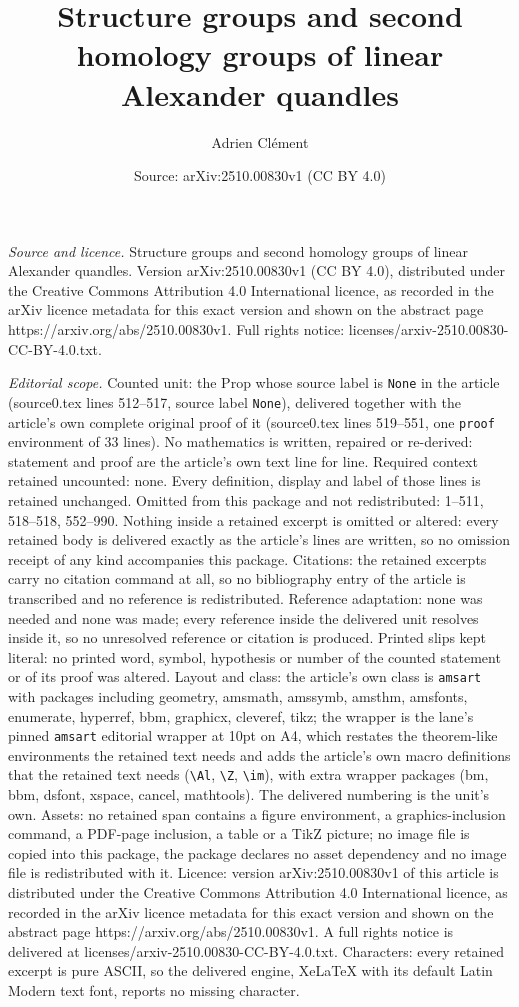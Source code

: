 \documentclass[10pt,a4paper]{amsart}
\title[Structure groups and second homology groups of linear Alexan]{Structure groups and second homology groups of linear Alexander quandles}
\author{Adrien Cl\'ement}
\date{Source: arXiv:2510.00830v1 (CC BY 4.0)}
\begin{document}
\maketitle

\noindent\emph{Source and licence.} Structure groups and second homology groups of linear Alexander quandles. Version arXiv:2510.00830v1 (CC BY 4.0), distributed under the Creative Commons Attribution 4.0 International licence, as recorded in the arXiv licence metadata for this exact version and shown on the abstract page https://arxiv.org/abs/2510.00830v1. Full rights notice: licenses/arxiv-2510.00830-CC-BY-4.0.txt.\par\smallskip

\noindent\textit{Editorial scope.} Counted unit: the Prop whose source label is \texttt{None} in the article (source0.tex lines 512--517, source label \texttt{None}), delivered together with the article's own complete original proof of it (source0.tex lines 519--551, one \texttt{proof} environment of 33 lines). No mathematics is written, repaired or re-derived: statement and proof are the article's own text line for line. Required context retained uncounted: none. Every definition, display and label of those lines is retained unchanged. Omitted from this package and not redistributed: 1--511, 518--518, 552--990. Nothing inside a retained excerpt is omitted or altered: every retained body is delivered exactly as the article's lines are written, so no omission receipt of any kind accompanies this package. Citations: the retained excerpts carry no citation command at all, so no bibliography entry of the article is transcribed and no reference is redistributed. Reference adaptation: none was needed and none was made; every reference inside the delivered unit resolves inside it, so no unresolved reference or citation is produced. Printed slips kept literal: no printed word, symbol, hypothesis or number of the counted statement or of its proof was altered. Layout and class: the article's own class is \texttt{amsart} with packages including geometry, amsmath, amssymb, amsthm, amsfonts, enumerate, hyperref, bbm, graphicx, cleveref, tikz; the wrapper is the lane's pinned \texttt{amsart} editorial wrapper at 10pt on A4, which restates the theorem-like environments the retained text needs and adds the article's own macro definitions that the retained text needs (\texttt{\textbackslash Al}, \texttt{\textbackslash Z}, \texttt{\textbackslash im}), with extra wrapper packages (bm, bbm, dsfont, xspace, cancel, mathtools). The delivered numbering is the unit's own. Assets: no retained span contains a figure environment, a graphics-inclusion command, a PDF-page inclusion, a table or a TikZ picture; no image file is copied into this package, the package declares no asset dependency and no image file is redistributed with it. Licence: version arXiv:2510.00830v1 of this article is distributed under the Creative Commons Attribution 4.0 International licence, as recorded in the arXiv licence metadata for this exact version and shown on the abstract page https://arxiv.org/abs/2510.00830v1. A full rights notice is delivered at licenses/arxiv-2510.00830-CC-BY-4.0.txt. Characters: every retained excerpt is pure ASCII, so the delivered engine, XeLaTeX with its default Latin Modern text font, reports no missing character.
\end{document}
